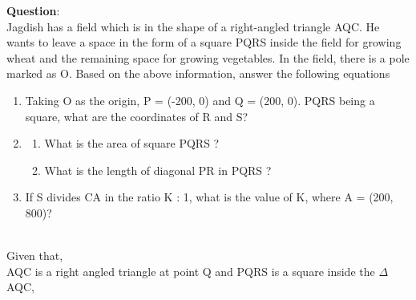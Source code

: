 \documentclass[journal]{IEEEtran}
\begin{document}
	\textbf{Question}:\\
        Jagdish has a field which is in the shape of a right-angled triangle AQC. He wants to leave a space in the form of a square PQRS inside the field for growing wheat and the remaining space for growing vegetables. In the field, there is a pole marked as O. Based on the above information, answer the following equations
        \begin{enumerate}[label=\alph*)]
            \item Taking O as the origin, P = (-200, 0) and Q = (200, 0). PQRS being a square, what are the coordinates of R and S?
            \item 
            \begin{enumerate}[label=\roman*)]
                \item What is the area of square PQRS ?
                \item What is the length of diagonal PR in PQRS ?
            \end{enumerate}
            \item If S divides CA in the ratio K : 1, what is the value of K, where A = (200, 800)?
        \end{enumerate}
        \solution \\
        Given that,\\ AQC is a right angled triangle at point Q and PQRS is a square inside the $\Delta$AQC, 
\end{document}
